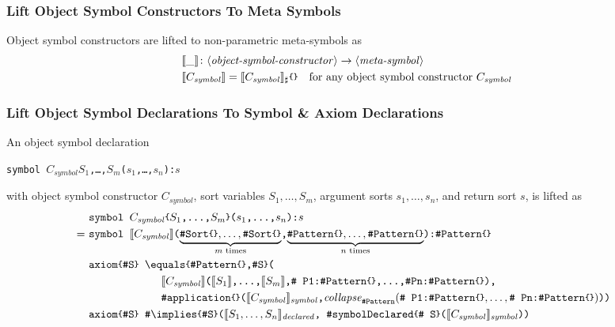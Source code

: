 \documentclass[UTF8,11pt]{article}
\theoremstyle{plain}
\theoremstyle{definition}
\theoremstyle{remark}
\newcommand{\parametric}[2]{{#1}\raisebox{.2ex}{\texttt{\footnotesize{\{}}}#2\raisebox{.2ex}{\texttt{\footnotesize{\}}}}}
\newcommand{\denote}[1]{\llbracket{#1}\rrbracket}
\newcommand{\sharpsymbol}{\#}
\newcommand{\KSort}{\texttt{\sharpsymbol Sort}}
\newcommand{\KPattern}{\texttt{\sharpsymbol Pattern}}
\newcommand{\Kimplies}{\texttt{\sharpsymbol  \slashsymbol implies}}
\newcommand{\Kapplication}{\texttt{\sharpsymbol application}}
\newcommand{\KsymbolDeclared}{\texttt{\sharpsymbol symbolDeclared}}
\newcommand{\slashsymbol}{\symbol{92}}
\newcommand{\slsh}[1]{\texttt{\slashsymbol#1}}
\newcommand{\slequals}{\slsh{equals}}
\newcommand{\itsymbol}{\mathit{symbol}}
\newcommand{\itdeclared}{\mathit{declared}}
\newcommand{\collapse}{\mathit{collapse}}
\newcommand{\syntacc}[1]{\text{$\langle$\textit{#1}$\rangle$}}
\begin{document}
\subsubsection{Lift Object Symbol Constructors To Meta Symbols}
Object symbol constructors are lifted to non-parametric meta-symbols as
\begin{align*}
& \denote{\_} \colon \syntacc{object-symbol-constructor} \to 
\syntacc{meta-symbol}\\
& \denote{C_\itsymbol} = \parametric{\denote{C_\itsymbol}_\sharp}{} \quad 
\text{for any object symbol constructor $C_\itsymbol$}
\end{align*}


\subsubsection{Lift Object Symbol Declarations To Symbol \& Axiom Declarations}
An object symbol declaration \begin{center}
	\texttt{symbol 
\parametric{$C_\itsymbol$}{$S_1$,\dots,$S_m$}($s_1$,\dots,$s_n$):$s$}
\end{center}
with object symbol constructor $C_\itsymbol$, sort vari$  $ables $S_1,\dots,S_m$, 
argument sorts $s_1,\dots,s_n$, and return sort $s$, is lifted as
\begin{align*}
& \texttt{symbol 
	\parametric{$C_\itsymbol$}{$S_1$,\dots,$S_m$}($s_1$,\dots,$s_n$):$s$}
\\ =\
& \texttt{symbol 
$\denote{C_\itsymbol}$($\underbrace{\parametric{\KSort}{},\dots,
	\parametric{\KSort}{}}_\textrm{$m$ times}$,$\underbrace{
	\parametric{\KPattern}{},\dots,\parametric{
		\KPattern}{}}_\textrm{$n$ times}$):\parametric{\KPattern}{}}
\\ 
& \texttt{\parametric{axiom}{\sharpsymbol S}
\parametric{\slequals}{\parametric{\KPattern}{},\sharpsymbol S}(
}
\\
& \qquad\qquad\qquad \texttt{
	$\denote{C_\itsymbol}$($\denote{S_1}$,\dots,$\denote{S_m}$,\sharpsymbol 
	P1:\parametric{\KPattern}{},\dots,\sharpsymbol Pn:\parametric{\KPattern}{}),
}
\\
& \qquad\qquad\qquad \texttt{
	\parametric{\Kapplication}{}($\denote{
		C_\itsymbol}_\itsymbol$,$\collapse_\KPattern(\texttt{\sharpsymbol 
			P1:\parametric{\KPattern}{}},\dots,\texttt{\sharpsymbol 
			Pn:\parametric{\KPattern}{}})$))
}
\\
& \texttt{\parametric{axiom}{\sharpsymbol S}
	\parametric{\Kimplies}{\sharpsymbol S}($\denote{
		S_1,\dots,S_n}_\itdeclared$,
	\parametric{\KsymbolDeclared}{\sharpsymbol 
	S}($\denote{C_\itsymbol}_\itsymbol$))
}
\end{align*}
\end{document}
